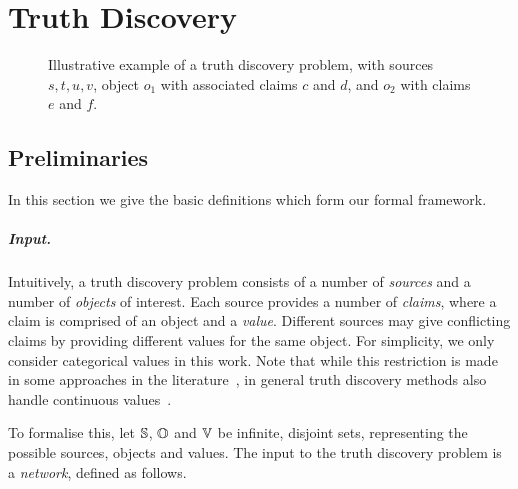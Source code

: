 \chapter{Truth Discovery}


\begin{figure}
    \centering
    \caption{
        Illustrative example of a truth discovery problem, with sources
        $s, t, u, v$, object $o_1$ with associated claims $c$ and $d$, and
        $o_2$ with claims $e$ and $f$.
    }
    \label{td_new_fig_intro_example}
\end{figure}

\section{Preliminaries}
\label{td_new_sec_preliminaries}

In this section we give the basic definitions which form our formal framework.

\paragraph{Input.}

Intuitively, a truth discovery problem consists of a number of \emph{sources}
and a number of \emph{objects} of interest. Each source provides a number of
\emph{claims}, where a claim is comprised of an object and a \emph{value}.
Different sources may give conflicting claims by providing different values for
the same object. For simplicity, we only consider categorical values in this
work. Note that while this restriction is made in some approaches in the
literature~\cite{pasternack2010,yin2008,wang_truth_2012,dong_truth_2009,zhang2018},
in general truth discovery methods also handle continuous
values~\cite{li2016,xiao2016}.

To formalise this, let $\S$, $\O$ and $\V$ be infinite, disjoint sets,
representing the possible sources, objects and values. The input to the truth
discovery problem is a \emph{network}, defined as follows.

